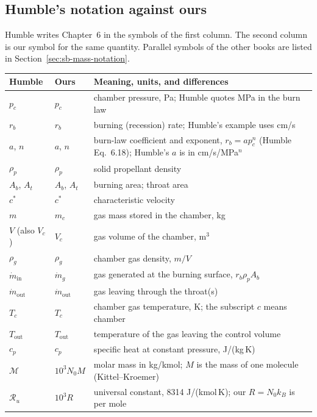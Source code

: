 \subsection{Humble's notation against ours}
\label{sec:ld-notation}
Humble writes Chapter~6 in the symbols of the first column. The second
column is our symbol for the same quantity. Parallel symbols of the
other books are listed in Section~\ref{sec:sb-mass-notation}.
\begin{center}
\begin{tabular}{p{2.2cm}p{2.0cm}p{7.6cm}}
Humble & Ours & Meaning, units, and differences\\ \hline
$p_c$ & $p_c$ & chamber pressure, Pa; Humble quotes MPa in
                 the burn law\\
$r_b$ & $r_b$ & burning (recession) rate; Humble's example uses cm/s\\
$a$, $n$ & $a$, $n$ & burn-law coefficient and exponent,
                 $r_b=ap_c^n$ (Humble Eq.~6.18); Humble's $a$ is in
                 cm/s/MPa$^n$\\
$\rho_p$ & $\rho_p$ & solid propellant density\\
$A_b$, $A_t$ & $A_b$, $A_t$ & burning area; throat area\\
$c^*$ & $c^*$ & characteristic velocity\\
$m$ & $m_c$ & gas mass stored in the chamber, kg\\
$V$ (also $V_c$) & $V_c$ & gas volume of the chamber, m$^3$\\
$\rho_g$ & $\rho_g$ & chamber gas density, $m/V$\\
$\dot m_{\mathrm{in}}$ & $\dot m_g$ & gas generated at the burning
                 surface, $r_b\rho_pA_b$\\
$\dot m_{\mathrm{out}}$ & $\dot m_{\mathrm{out}}$ & gas leaving
                 through the throat(s)\\
$T_c$ & $T_c$ & chamber gas temperature, K; the subscript $c$
                 means chamber\\
$T_{\mathrm{out}}$ & $T_{\mathrm{out}}$ & temperature of the gas
                 leaving the control volume\\
$c_p$ & $c_p$ & specific heat at constant pressure, J/(kg\,K)\\
$\mathcal M$ & $10^3N_0M$ & molar mass in kg/kmol; $M$ is the mass of
                 one molecule (Kittel--Kroemer)\\
$\mathcal R_u$ & $10^3R$ & universal constant, 8314 J/(kmol\,K);
                 our $R=N_0k_B$ is per mole\\

\end{tabular}
\end{center}
